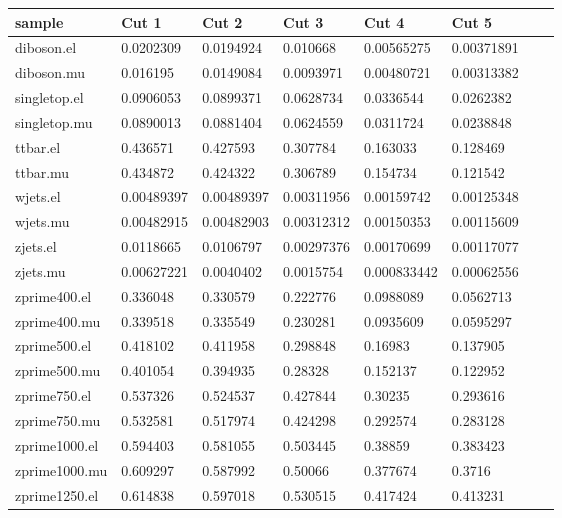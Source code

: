   \begin{table}[]
    \begin{tabular}{l|lllllll}
    sample             & Cut 1 & Cut 2 & Cut 3 & Cut 4     & Cut 5   \\
    \hline
      diboson.el    & 0.0202309  & 0.0194924  & 0.010668   & 0.00565275  & 0.00371891  \\
      diboson.mu    & 0.016195   & 0.0149084  & 0.0093971  & 0.00480721  & 0.00313382  \\
      singletop.el  & 0.0906053  & 0.0899371  & 0.0628734  & 0.0336544   & 0.0262382   \\
      singletop.mu  & 0.0890013  & 0.0881404  & 0.0624559  & 0.0311724   & 0.0238848   \\
      ttbar.el      & 0.436571   & 0.427593   & 0.307784   & 0.163033    & 0.128469    \\
      ttbar.mu      & 0.434872   & 0.424322   & 0.306789   & 0.154734    & 0.121542    \\
      wjets.el      & 0.00489397 & 0.00489397 & 0.00311956 & 0.00159742  & 0.00125348  \\
      wjets.mu      & 0.00482915 & 0.00482903 & 0.00312312 & 0.00150353  & 0.00115609  \\
      zjets.el      & 0.0118665  & 0.0106797  & 0.00297376 & 0.00170699  & 0.00117077  \\
      zjets.mu      & 0.00627221 & 0.0040402  & 0.0015754  & 0.000833442 & 0.00062556  \\
      zprime400.el  & 0.336048   & 0.330579   & 0.222776   & 0.0988089   & 0.0562713   \\
      zprime400.mu  & 0.339518   & 0.335549   & 0.230281   & 0.0935609   & 0.0595297   \\
      zprime500.el  & 0.418102   & 0.411958   & 0.298848   & 0.16983     & 0.137905    \\
      zprime500.mu  & 0.401054   & 0.394935   & 0.28328    & 0.152137    & 0.122952    \\
      zprime750.el  & 0.537326   & 0.524537   & 0.427844   & 0.30235     & 0.293616    \\
      zprime750.mu  & 0.532581   & 0.517974   & 0.424298   & 0.292574    & 0.283128    \\
      zprime1000.el & 0.594403   & 0.581055   & 0.503445   & 0.38859     & 0.383423    \\
      zprime1000.mu & 0.609297   & 0.587992   & 0.50066    & 0.377674    & 0.3716      \\
      zprime1250.el & 0.614838   & 0.597018   & 0.530515   & 0.417424    & 0.413231    \\

\end{tabular}
\end{table}
